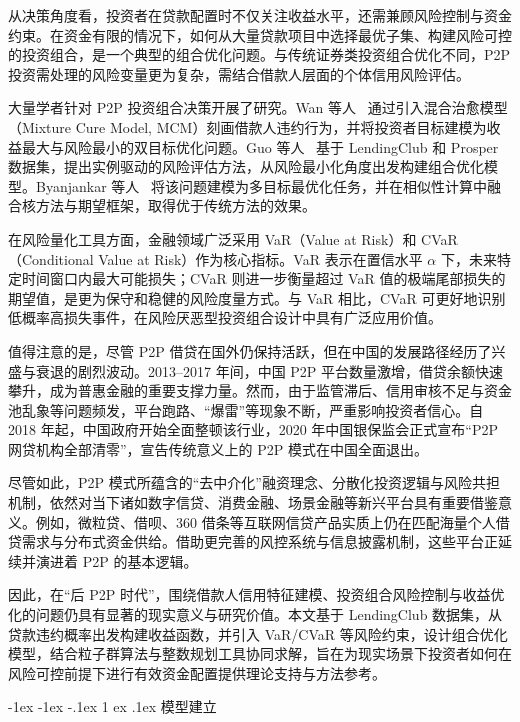 \documentclass{write_paper}
\makeatletter
\renewcommand\section{\@startsection {section}{1}{\z@}%
                                   {-1ex \@plus -1ex \@minus -.1ex}%
                                   {1 ex \@plus.1ex}%
                                   {\normalfont\large\bfseries}}
\makeatother
\begin{document}
从决策角度看，投资者在贷款配置时不仅关注收益水平，还需兼顾风险控制与资金约束。在资金有限的情况下，如何从大量贷款项目中选择最优子集、构建风险可控的投资组合，是一个典型的组合优化问题。与传统证券类投资组合优化不同，P2P 投资需处理的风险变量更为复杂，需结合借款人层面的个体信用风险评估。

大量学者针对 P2P 投资组合决策开展了研究。Wan 等人~\cite{wan2023hybrid} 通过引入混合治愈模型（Mixture Cure Model, MCM）刻画借款人违约行为，并将投资者目标建模为收益最大与风险最小的双目标优化问题。Guo 等人~\cite{guo2016instance} 基于 LendingClub 和 Prosper 数据集，提出实例驱动的风险评估方法，从风险最小化角度出发构建组合优化模型。Byanjankar 等人~\cite{byanjankar2021data} 将该问题建模为多目标最优化任务，并在相似性计算中融合核方法与期望框架，取得优于传统方法的效果。

在风险量化工具方面，金融领域广泛采用 VaR（Value at Risk）和 CVaR（Conditional Value at Risk）作为核心指标。VaR 表示在置信水平 $\alpha$ 下，未来特定时间窗口内最大可能损失；CVaR 则进一步衡量超过 VaR 值的极端尾部损失的期望值，是更为保守和稳健的风险度量方式。与 VaR 相比，CVaR 可更好地识别低概率高损失事件，在风险厌恶型投资组合设计中具有广泛应用价值。

值得注意的是，尽管 P2P 借贷在国外仍保持活跃，但在中国的发展路径经历了兴盛与衰退的剧烈波动。2013--2017 年间，中国 P2P 平台数量激增，借贷余额快速攀升，成为普惠金融的重要支撑力量。然而，由于监管滞后、信用审核不足与资金池乱象等问题频发，平台跑路、“爆雷”等现象不断，严重影响投资者信心。自 2018 年起，中国政府开始全面整顿该行业，2020 年中国银保监会正式宣布“P2P 网贷机构全部清零”，宣告传统意义上的 P2P 模式在中国全面退出。

尽管如此，P2P 模式所蕴含的“去中介化”融资理念、分散化投资逻辑与风险共担机制，依然对当下诸如数字信贷、消费金融、场景金融等新兴平台具有重要借鉴意义。例如，微粒贷、借呗、360 借条等互联网信贷产品实质上仍在匹配海量个人借贷需求与分布式资金供给。借助更完善的风控系统与信息披露机制，这些平台正延续并演进着 P2P 的基本逻辑。

因此，在“后 P2P 时代”，围绕借款人信用特征建模、投资组合风险控制与收益优化的问题仍具有显著的现实意义与研究价值。本文基于 LendingClub 数据集，从贷款违约概率出发构建收益函数，并引入 VaR/CVaR 等风险约束，设计组合优化模型，结合粒子群算法与整数规划工具协同求解，旨在为现实场景下投资者如何在风险可控前提下进行有效资金配置提供理论支持与方法参考。

 
\section{模型建立}
\end{document}

